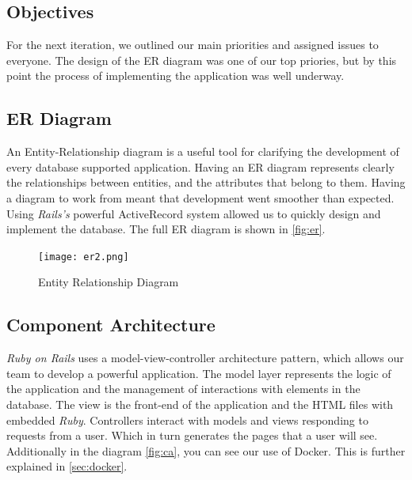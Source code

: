 \documentclass{l3proj}
\begin{document}
\subsection{Objectives}
\label{sec:design-objectives}

For the next iteration, we outlined our main priorities and assigned issues to everyone. The design of the ER diagram was one of our top priories, but by this point the process of implementing the application was well underway.

\subsection{ER Diagram}
\label{sec:er}

An Entity-Relationship diagram \cite{er} is a useful tool for clarifying the development of every database supported application. Having an ER diagram represents clearly the relationships between entities, and the attributes that belong to them. Having a diagram to work from meant that development went smoother than expected. Using \textit{Rails's} powerful ActiveRecord system allowed us to quickly design and implement the database. The full ER diagram is shown in \autoref{fig:er}.

\begin{figure}
\centerline{\texttt{[image: er2.png]}}
\caption{Entity Relationship Diagram}
\label{fig:er}
\end{figure}

\subsection{Component Architecture}
\label{sec:component}

\textit{Ruby on Rails} uses a model-view-controller architecture pattern, which allows our team to develop a powerful application. The model layer represents the logic of the application and the management of interactions with elements in the database. The view is the front-end of the application and the HTML files with embedded \textit{Ruby}. Controllers interact with models and views responding to requests from a user. Which in turn generates the pages that a user will see. Additionally in the diagram \autoref{fig:ca}, you can see our use of Docker. This is further explained in \autoref{sec:docker}.
\end{document}

